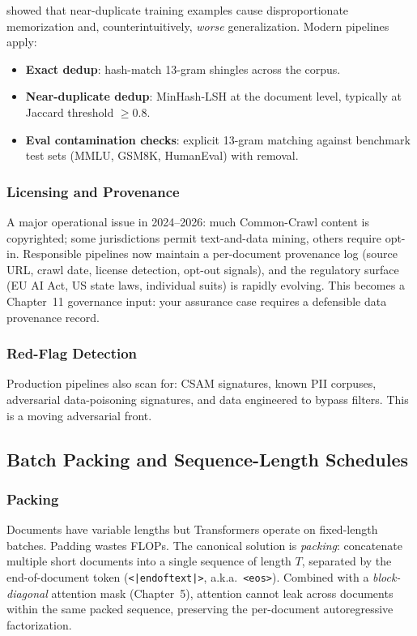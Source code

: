 \citet{lee2022deduplicating} showed that near-duplicate training
examples cause disproportionate memorization and, counterintuitively,
\emph{worse} generalization. Modern pipelines apply:
\begin{itemize}
  \item \textbf{Exact dedup}: hash-match 13-gram shingles across the
        corpus.
  \item \textbf{Near-duplicate dedup}: MinHash-LSH at the document
        level, typically at Jaccard threshold $\ge 0.8$.
  \item \textbf{Eval contamination checks}: explicit 13-gram matching
        against benchmark test sets (MMLU, GSM8K, HumanEval) with
        removal.
\end{itemize}

\subsubsection{Licensing and Provenance}

A major operational issue in 2024--2026: much Common-Crawl content is
copyrighted; some jurisdictions permit text-and-data mining, others
require opt-in. Responsible pipelines now maintain a per-document
provenance log (source URL, crawl date, license detection, opt-out
signals), and the regulatory surface (EU AI Act, US state laws,
individual suits) is rapidly evolving. This becomes a Chapter~11
governance input: your assurance case requires a defensible data
provenance record.

\subsubsection{Red-Flag Detection}

Production pipelines also scan for: CSAM signatures, known PII
corpuses, adversarial data-poisoning signatures, and data engineered
to bypass filters. This is a moving adversarial front.

\subsection{Batch Packing and Sequence-Length Schedules}

\subsubsection{Packing}

Documents have variable lengths but Transformers operate on
fixed-length batches. Padding wastes FLOPs. The canonical solution is
\emph{packing}: concatenate multiple short documents into a single
sequence of length $T$, separated by the end-of-document token
(\texttt{<|endoftext|>}, a.k.a.\ \texttt{<eos>}). Combined with a
\emph{block-diagonal} attention mask (Chapter~5), attention cannot leak
across documents within the same packed sequence, preserving the
per-document autoregressive factorization.

